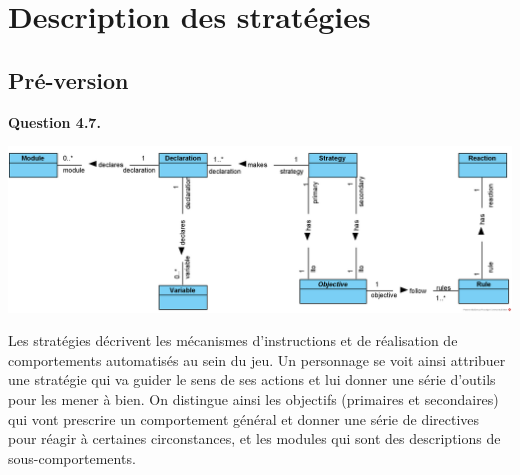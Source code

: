 \documentclass[oneside,a4paper]{book}
\begin{document}
\newpage
\chapter{Description des stratégies}

\section{Pré-version}

\textbf{Question 4.7.}\label{Question 4.7.}\newline
 
\includegraphics[width=\textwidth,height=\textheight,keepaspectratio]{Diagrams/DS-preversion.png}\newline

Les stratégies décrivent les mécanismes d'instructions et de réalisation de comportements automatisés au sein du jeu. Un personnage se voit ainsi attribuer une stratégie qui va guider le sens de ses actions et lui donner une série d'outils pour les mener à bien. On distingue ainsi les objectifs (primaires et secondaires) qui vont prescrire un comportement général et donner une série de directives pour réagir à certaines circonstances, et les modules qui sont des descriptions de sous-comportements.
\end{document}
